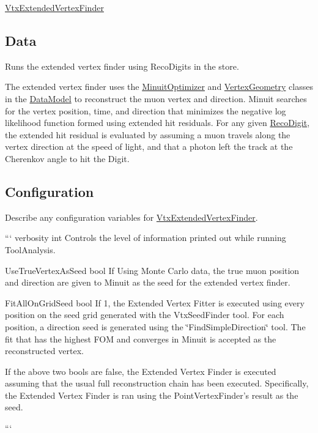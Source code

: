 \hyperlink{classVtxExtendedVertexFinder}{Vtx\-Extended\-Vertex\-Finder}

\subsection*{Data}

Runs the extended vertex finder using Reco\-Digits in the store.

The extended vertex finder uses the \hyperlink{classMinuitOptimizer}{Minuit\-Optimizer} and \hyperlink{classVertexGeometry}{Vertex\-Geometry} classes in the \hyperlink{classDataModel}{Data\-Model} to reconstruct the muon vertex and direction. Minuit searches for the vertex position, time, and direction that minimizes the negative log likelihood function formed using extended hit residuals. For any given \hyperlink{classRecoDigit}{Reco\-Digit}, the extended hit residual is evaluated by assuming a muon travels along the vertex direction at the speed of light, and that a photon left the track at the Cherenkov angle to hit the Digit.

\subsection*{Configuration}

Describe any configuration variables for \hyperlink{classVtxExtendedVertexFinder}{Vtx\-Extended\-Vertex\-Finder}.

``` verbosity int Controls the level of information printed out while running Tool\-Analysis.

Use\-True\-Vertex\-As\-Seed bool If Using Monte Carlo data, the true muon position and direction are given to Minuit as the seed for the extended vertex finder.

Fit\-All\-On\-Grid\-Seed bool If 1, the Extended Vertex Fitter is executed using every position on the seed grid generated with the Vtx\-Seed\-Finder tool. For each position, a direction seed is generated using the \char`\"{}\-Find\-Simple\-Direction\char`\"{} tool. The fit that has the highest F\-O\-M and converges in Minuit is accepted as the reconstructed vertex.

If the above two bools are false, the Extended Vertex Finder is executed assuming that the usual full reconstruction chain has been executed. Specifically, the Extended Vertex Finder is ran using the Point\-Vertex\-Finder's result as the seed.

``` 